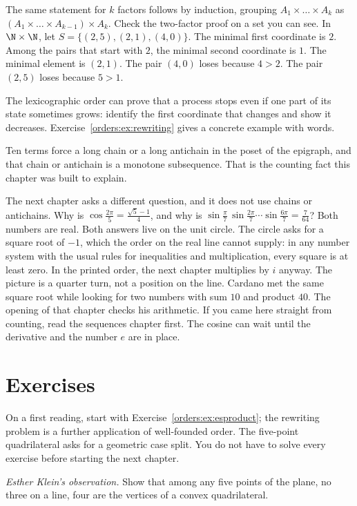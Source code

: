 The same statement for $k$ factors follows by induction, grouping $A_1\times\dots\times A_k$ as $(A_1\times\dots\times A_{k-1})\times A_k$. Check the two-factor proof on a set you can see. In $\N\times\N$, let $S=\{(2,5),(2,1),(4,0)\}$. The minimal first coordinate is $2$. Among the pairs that start with $2$, the minimal second coordinate is $1$. The minimal element is $(2,1)$. The pair $(4,0)$ loses because $4>2$. The pair $(2,5)$ loses because $5>1$.

The lexicographic order can prove that a process stops even if one part of its state sometimes grows: identify the first coordinate that changes and show it decreases. Exercise~\ref{orders:ex:rewriting} gives a concrete example with words.

Ten terms force a long chain or a long antichain in the poset of the epigraph, and that chain or antichain is a monotone subsequence. That is the counting fact this chapter was built to explain.

The next chapter asks a different question, and it does not use chains or antichains. Why is $\cos\frac{2\pi}5=\frac{\sqrt5-1}4$, and why is $\sin\frac\pi7\,\sin\frac{2\pi}7\cdots\sin\frac{6\pi}7=\frac7{64}$? Both numbers are real. Both answers live on the unit circle. The circle asks for a square root of $-1$, which the order on the real line cannot supply: in any number system with the usual rules for inequalities and multiplication, every square is at least zero. In the printed order, the next chapter multiplies by $i$ anyway. The picture is a quarter turn, not a position on the line. Cardano met the same square root while looking for two numbers with sum $10$ and product $40$. The opening of that chapter checks his arithmetic. If you came here straight from counting, read the sequences chapter first. The cosine can wait until the derivative and the number $e$ are in place.

\section{Exercises}

On a first reading, start with Exercise~\ref{orders:ex:esproduct}; the rewriting problem is a further application of well-founded order. The five-point quadrilateral asks for a geometric case split. You do not have to solve every exercise before starting the next chapter.

\begin{exercise}[$\star\star$]\label{orders:ex:klein}
\emph{Esther Klein's observation.} Show that among any five points of the plane, no three on a line, four are the vertices of a convex quadrilateral.
\end{exercise}

